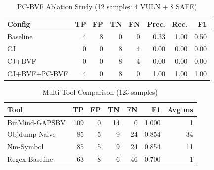 \begin{table}[htbp]
\centering
\caption{PC-BVF Ablation Study (12 samples: 4 VULN + 8 SAFE)}
\label{tab:pcbvf-ablation}
\begin{tabular}{lrrrrrrr}
\toprule
Config & TP & FP & TN & FN & Prec. & Rec. & F1 \\
\midrule
Baseline & 4 & 8 & 0 & 0 & 0.33 & 1.00 & 0.50 \\
CJ & 0 & 0 & 8 & 4 & 0.00 & 0.00 & 0.00 \\
CJ+BVF & 0 & 0 & 8 & 4 & 0.00 & 0.00 & 0.00 \\
CJ+BVF+PC-BVF & 4 & 0 & 8 & 0 & 1.00 & 1.00 & 1.00 \\
\bottomrule
\end{tabular}
\end{table}

\begin{table}[htbp]
\centering
\caption{Multi-Tool Comparison (123 samples)}
\label{tab:multi-tool-123}
\begin{tabular}{lrrrrrr}
\toprule
Tool & TP & FP & TN & FN & F1 & Avg ms \\
\midrule
BinMind-GAPSBV & 109 & 0 & 14 & 0 & 1.000 & 1 \\
Objdump-Naive & 85 & 5 & 9 & 24 & 0.854 & 34 \\
Nm-Symbol & 85 & 5 & 9 & 24 & 0.854 & 11 \\
Regex-Baseline & 63 & 8 & 6 & 46 & 0.700 & 1 \\
\bottomrule
\end{tabular}
\end{table}
